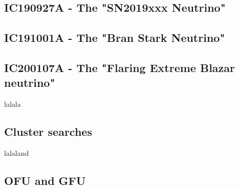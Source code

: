 \subsection{IC190927A - The "SN2019xxx Neutrino"}

\subsection{IC191001A - The "Bran Stark Neutrino"}

\subsection{IC200107A - The "Flaring Extreme Blazar neutrino"}

lalala

\subsection{Cluster searches}
lalaland

\subsection{OFU and GFU}